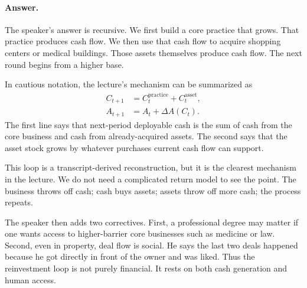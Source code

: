 \paragraph{Answer.} The speaker's answer is recursive. We first build a core practice that grows. That practice produces cash flow. We then use that cash flow to acquire shopping centers or medical buildings. Those assets themselves produce cash flow. The next round begins from a higher base.

In cautious notation, the lecture's mechanism can be summarized as
\begin{align}
C_{t+1} &= C_t^{\mathrm{practice}} + C_t^{\mathrm{asset}},\\
A_{t+1} &= A_t + \Delta A(C_t).
\end{align}
The first line says that next-period deployable cash is the sum of cash from the core business and cash from already-acquired assets. The second says that the asset stock grows by whatever purchases current cash flow can support.

\begin{figure}[h]
\centering
{}
\end{figure}

This loop is a transcript-derived reconstruction, but it is the clearest mechanism in the lecture. We do not need a complicated return model to see the point. The business throws off cash; cash buys assets; assets throw off more cash; the process repeats.

The speaker then adds two correctives. First, a professional degree may matter if one wants access to higher-barrier core businesses such as medicine or law. Second, even in property, deal flow is social. He says the last two deals happened because he got directly in front of the owner and was liked. Thus the reinvestment loop is not purely financial. It rests on both cash generation and human access.

